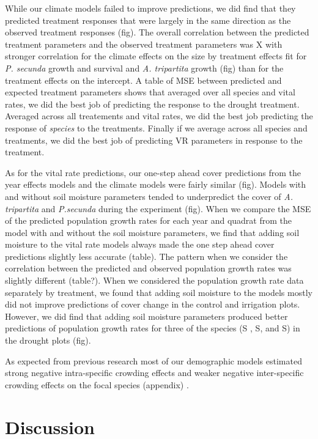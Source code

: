 \documentclass[11pt]{article}
\begin{document}
\begin{doublespacing}
{While our climate models failed to improve predictions, we did find that they predicted treatment responses that were largely in the same direction as the observed treatment responses (fig).  The overall correlation between the predicted treatment parameters and the observed treatment parameters was X with stronger correlation for the climate effects on the size by treatment effects fit for \textit{P. secunda} growth and survival and \textit{A. tripartita} growth (fig) than for the treatment effects on the intercept.  A table of MSE between predicted and expected treatment parameters shows that averaged over all species and vital rates, we did the best job of predicting the response to the drought treatment.  Averaged across all treatements and vital rates, we did the best job predicting the response of \textit{species} to the treatments. Finally if we average across all species and treatments, we did the best job of predicting VR parameters in response to the treatment. 

As for the vital rate predictions, our one-step ahead cover predictions from the year effects models and the climate models were fairly similar (fig). Models with and without soil moisture parameters tended to underpredict the cover of \textit{A. tripartita} and \textit{P.secunda} during the experiment (fig).  When we compare the MSE of the predicted population growth rates for each year and quadrat from the model with and without the soil moisture parameters, we find that adding soil moisture to the vital rate models always made the one step ahead cover predictions slightly less accurate (table).  The pattern when we consider the correlation between the predicted and observed population growth rates was slightly different (table?).  When we considered the population growth rate data separately by treatment, we found that adding soil moisture to the models mostly did not improve predictions of cover change in the control and irrigation plots. However, we did find that adding soil moisture parameters produced better predictions of population growth rates for three of the species (S , S, and S) in the drought plots (fig). 
  
As expected from previous research most of our demographic models estimated strong negative intra-specific crowding effects and weaker negative inter-specific crowding effects on the focal species (appendix) \citep{adler_coexistence_2010,chu_direct_2016,chu_large_2015}.
 

\section*{Discussion}

}
\end{doublespacing}
\end{document}
